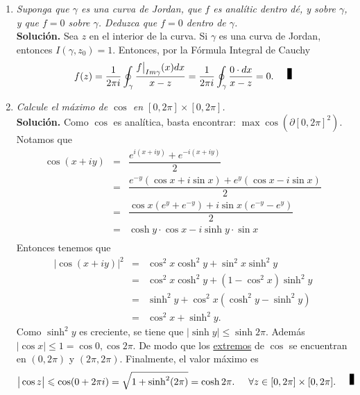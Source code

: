 \documentclass[10pt,a5paper]{article}
\begin{document}
\titulo

\begin{enumerate}

	\item \textit{Suponga que \(\gamma\) es una curva de Jordan, que \(f\) es analític dentro dé, y sobre \(\gamma \), y que \(f=0\) sobre \(\gamma\). Deduzca que \(f = 0\) dentro de \(\gamma\).} \\[2mm]
		\textbf{Solución.} Sea \(z\) en el interior de la curva. Si \(\gamma\) es una curva de Jordan, entonces \(I(\gamma ,z_0) =1\). Entonces, por la Fórmula Integral de Cauchy
		\[
			f(z) = \dfrac{1}{2 \pi i} \oint_ \gamma  \dfrac{f \big| _{Im \gamma} (x) dx}{x-z} = \dfrac{1}{2 \pi i} \oint_ \gamma  \dfrac{0 \cdot dx}{x-z} = 0. \qed
		\]

	\item \textit{Calcule el máximo de \(\cos \) en \([0, 2 \pi] \times [0, 2 \pi]\).}\\[2mm]
		\textbf{Solución.} Como \(\cos\) es analítica, basta encontrar: \(\max \cos (\partial [0, 2\pi] ^2)\). Notamos que
				\[
					\begin{array}{rcl}
						\cos (x+iy) &=& \dfrac{e^{i(x+iy)} +e^{-i(x+iy)}}{2} \\[2mm]
						& = & \dfrac{e^{-y} (\cos x+ i \sin x) +e^y(\cos x-i \sin x)}{2} \\[2mm]
						& = & \dfrac{\cos x (e^y+e^{-y}) + i\sin x(e^{-y} -e^y)}{2} \\[2mm]
						& = & \cosh y \cdot \cos x - i\sinh y \cdot \sin x \\[2mm]
					\end{array}
				\]
				Entonces tenemos que
				\[
					\begin{array}{rcl}
						\big| \cos (x+iy) \big| ^2 & = & \cos ^2x \cosh^2y+ \sin ^2x \sinh^2y \\[2mm]
						& = & \cos ^2x \cosh ^2y+(1- \cos ^2 x) \sinh ^2y \\[2mm]
						& = & \sinh ^2y + \cos ^2x(\cosh ^2y- \sinh ^2y) \\[2mm]
						& = & \cos ^2x+ \sinh ^2y.
					\end{array}
				\]
				Como \(\sinh ^2y\) es creciente, se tiene que \(| \sinh y| \leqslant \sinh 2 \pi \). Además \(\big| \cos x \big| \leqslant 1 = \cos 0, \cos 2 \pi\). De modo que los \underline{extremos} de \(\cos\) se encuentran en \((0,2 \pi)\) y \((2 \pi ,2 \pi)\).
				Finalmente, el valor máximo es
				\[
					\big| \cos z \big| \leqslant \cos (0+ 2 \pi i) = \sqrt{1+ \sinh ^2(2 \pi)} = \cosh 2 \pi . \hspace{5mm} \forall z \in [0, 2 \pi] \times [0, 2\pi ]. \qed
				\]


\end{enumerate}
\end{document}
